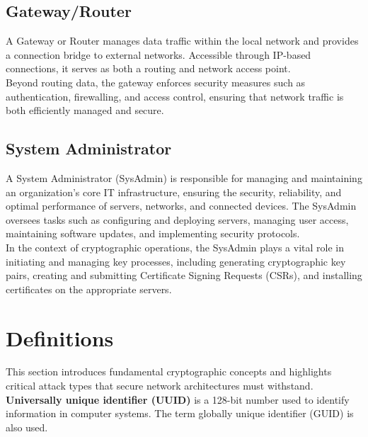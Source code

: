 \documentclass[pdflatex,sn-mathphys-num]{sn-jnl}%
\theoremstyle{thmstyleone}%
\theoremstyle{thmstyletwo}%
\theoremstyle{thmstylethree}%
\begin{document}
\subsection*{Gateway/Router}

A Gateway or Router manages data traffic within the local network and provides a connection bridge to external networks. Accessible through IP-based connections, it serves as both a routing and network access point.\\

Beyond routing data, the gateway enforces security measures such as authentication, firewalling, and access control, ensuring that network traffic is both efficiently managed and secure.

\subsection*{System Administrator}
A System Administrator (SysAdmin) is responsible for managing and maintaining an organization’s core IT infrastructure, ensuring the security, reliability, and optimal performance of servers, networks, and connected devices. The SysAdmin oversees tasks such as configuring and deploying servers, managing user access, maintaining software updates, and implementing security protocols.\\

In the context of cryptographic operations, the SysAdmin plays a vital role in initiating and managing key processes, including generating cryptographic key pairs, creating and submitting Certificate Signing Requests (CSRs), and installing certificates on the appropriate servers.


\section{Definitions}
\label{sec:2:definition}
This section introduces fundamental cryptographic concepts and highlights critical attack types that secure network architectures must withstand.\\


\noindent \textbf{Universally unique identifier (UUID)}  is a 128-bit number used to identify information in computer systems. The term globally unique identifier (GUID) is also used.\\
\end{document}
